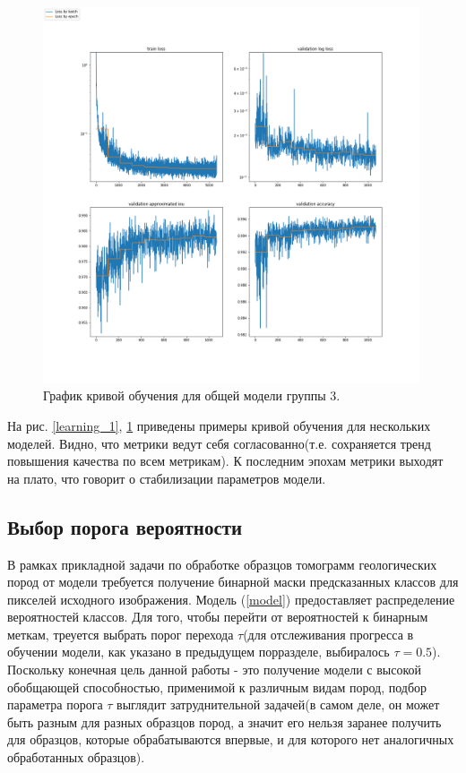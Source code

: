 \documentclass[14pt, a4paper, oneside, bold]{extarticle}
\begin{document}
\begin{figure}[h!] \label{learning_2}
\includegraphics[width=0.99\textwidth]{data/images/learning_progress_SoilB-2_Urna_22_carb96558.png}
\caption{График кривой обучения для общей модели группы 3.}
\end{figure}



На рис. \ref{learning_1}, \ref{learning_2} приведены примеры кривой обучения для нескольких моделей. Видно, что метрики ведут себя согласованно(т.е. сохраняется тренд повышения качества по всем метрикам). К последним эпохам метрики выходят на плато, что говорит о стабилизации параметров модели.


\subsection{Выбор порога вероятности} 

В рамках прикладной задачи по обработке образцов томограмм геологических пород от модели требуется получение бинарной маски предсказанных классов для пикселей исходного изображения. Модель 
(\ref{model}) предоставляет распределение вероятностей классов. Для того, чтобы перейти от вероятностей к бинарным меткам, треуется выбрать порог перехода $\tau$(для отслеживания прогресса в обучении модели, как указано в предыдущем порразделе, выбиралось $\tau=0.5$).
Поскольку конечная цель данной работы - это получение модели с высокой обобщающей способностью, применимой к различным видам пород, подбор параметра порога $\tau$ выглядит затруднительной задачей(в самом деле, он может быть разным для разных образцов пород, а значит его нельзя заранее получить для образцов, которые обрабатываются впервые, и для которого нет аналогичных обработанных образцов).
\end{document}
